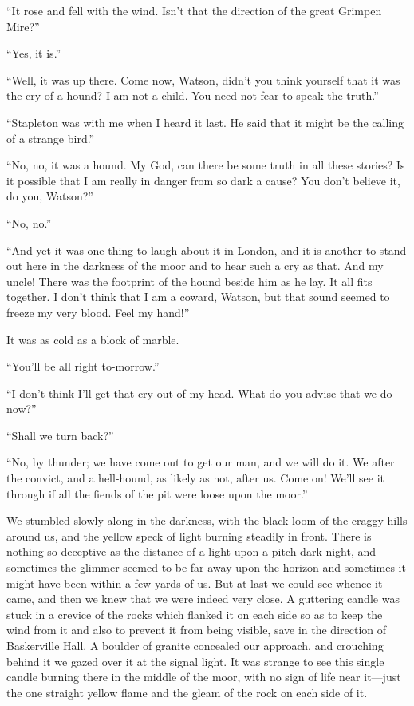 \documentclass[paper=5.5in:8.5in,BCOR=7mm,twoside,DIV=calc,12pt,usegeometry,openany,chapterprefix,endperiod,headings=big]{scrbook} %
\begin{document}
\enquote{It rose and fell with the wind. Isn't that the direction of the great Grimpen Mire?}

\enquote{Yes, it is.}

\enquote{Well, it was up there. Come now, Watson, didn't you think yourself that it was the cry of a hound? I am not a child. You need not fear to speak the truth.}

\enquote{Stapleton was with me when I heard it last. He said that it might be the calling of a strange bird.}

\enquote{No, no, it was a hound. My God, can there be some truth in all these stories? Is it possible that I am really in danger from so dark a cause? You don't believe it, do you, Watson?}

\enquote{No, no.}

\enquote{And yet it was one thing to laugh about it in London, and it is another to stand out here in the darkness of the moor and to hear such a cry as that. And my uncle! There was the footprint of the hound beside him as he lay. It all fits together. I don't think that I am a coward, Watson, but that sound seemed to freeze my very blood. Feel my hand!}

It was as cold as a block of marble.

\enquote{You'll be all right to-morrow.}

\enquote{I don't think I'll get that cry out of my head. What do you advise that we do now?}

\enquote{Shall we turn back?}

\enquote{No, by thunder; we have come out to get our man, and we will do it. We after the convict, and a hell-hound, as likely as not, after us. Come on! We'll see it through if all the fiends of the pit were loose upon the moor.}

We stumbled slowly along in the darkness, with the black loom of the craggy hills around us, and the yellow speck of light burning steadily in front. There is nothing so deceptive as the distance of a light upon a pitch-dark night, and sometimes the glimmer seemed to be far away upon the horizon and sometimes it might have been within a few yards of us. But at last we could see whence it came, and then we knew that we were indeed very close. A guttering candle was stuck in a crevice of the rocks which flanked it on each side so as to keep the wind from it and also to prevent it from being visible, save in the direction of Baskerville Hall. A boulder of granite concealed our approach, and crouching behind it we gazed over it at the signal light. It was strange to see this single candle burning there in the middle of the moor, with no sign of life near it---just the one straight yellow flame and the gleam of the rock on each side of it.
\end{document}
